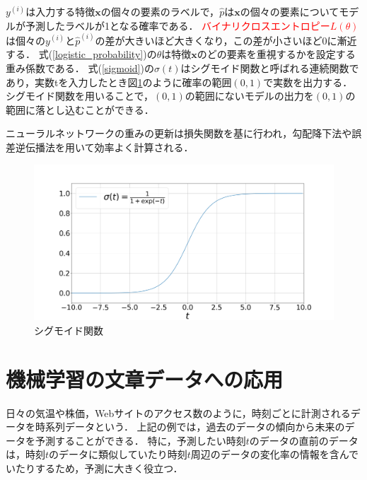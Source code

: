 \documentclass[12pt,a4j]{jreport}
\begin{document}
$y^{(i)}$は入力する特徴$\mathbf{x}$の個々の要素のラベルで，$\hat{p}$は$\mathbf{x}$の個々の要素についてモデルが予測したラベルが1となる確率である．
\textcolor{red}{バイナリクロスエントロピー$L(\theta)$}は個々の$y^{(i)}$と$\hat{p}^{(i)}$の差が大きいほど大きくなり，この差が小さいほど0に漸近する．
式(\ref{logistic_probability})の$\theta$は特徴$\mathbf{x}$のどの要素を重視するかを設定する重み係数である．
式(\ref{sigmoid})の$\sigma(t)$はシグモイド関数と呼ばれる連続関数であり，実数tを入力したとき図\ref{fig_sigmoid}のように確率の範囲$(0, 1)$で実数を出力する．シグモイド関数を用いることで，$(0, 1)$の範囲にないモデルの出力を$(0, 1)$の範囲に落とし込むことができる．

ニューラルネットワークの重みの更新は損失関数を基に行われ，勾配降下法や誤差逆伝播法を用いて効率よく計算される．

\begin{figure}[H]
  \centering
  \includegraphics[keepaspectratio, width=120mm]{img/sigmoid.png}
  \caption{シグモイド関数}
  \label{fig_sigmoid}
\end{figure}





\section{機械学習の文章データへの応用}
\label{apply_for_time_series_data}
日々の気温や株価，Webサイトのアクセス数のように，時刻ごとに計測されるデータを時系列データという\cite{aurellen20}．
上記の例では，過去のデータの傾向から未来のデータを予測することができる．
特に，予測したい時刻$t$のデータの直前のデータは，時刻$t$のデータに類似していたり時刻$t$周辺のデータの変化率の情報を含んでいたりするため，予測に大きく役立つ．
\end{document}
